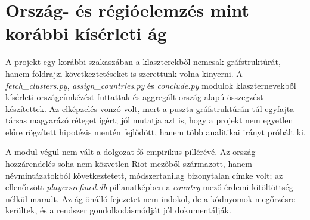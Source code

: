 \section{Ország- és régióelemzés mint korábbi kísérleti ág}

A projekt egy korábbi szakaszában a klaszterekből nemcsak gráfstruktúrát, hanem földrajzi következtetéseket is szerettünk volna kinyerni. A \textit{fetch\_clusters.py}, \textit{assign\_countries.py} és \textit{conclude.py} modulok klaszternevekből kísérleti országcímkézést futtattak és aggregált ország-alapú összegzést készítettek. Az elképzelés vonzó volt, mert a puszta gráfstruktúrán túl egyfajta társas magyarázó réteget ígért; jól mutatja azt is, hogy a projekt nem egyetlen előre rögzített hipotézis mentén fejlődött, hanem több analitikai irányt próbált ki.

A modul végül nem vált a dolgozat fő empirikus pillérévé. Az ország-hozzárendelés soha nem közvetlen Riot-mezőből származott, hanem névmintázatokból következtetett, módszertanilag bizonytalan címke volt; az ellenőrzött \textit{playersrefined.db} pillanatképben a \textit{country} mező érdemi kitöltöttség nélkül maradt. Az ág önálló fejezetet nem indokol, de a kódnyomok megőrzésre kerültek, és a rendszer gondolkodásmódját jól dokumentálják.

